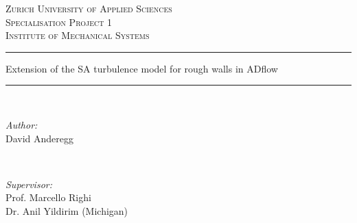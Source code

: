 \begin{titlepage}

\newcommand{\HRule}{\rule{\linewidth}{0.5mm}} %

\center %
 

\textsc{\LARGE Zurich University of Applied Sciences}\\[1.5cm] %
\textsc{\Large Specialisation Project 1}\\[0.5cm] %
\textsc{\large Institute of Mechanical Systems}\\[0.5cm] %


\HRule 
{ \huge \bfseries
  \begin{spacing}{1.2}
    Extension of the SA turbulence model for rough walls in ADflow
  \end{spacing}}
\HRule \\[0.5cm]
 

\begin{minipage}{0.4\textwidth}
\begin{flushleft} \large
\emph{Author:}\\
David Anderegg\\
\end{flushleft}
\end{minipage}
~
\begin{minipage}{0.4\textwidth}
\begin{flushright} \large
\emph{Supervisor:} \\
Prof. Marcello Righi \\
Dr. Anil Yildirim (Michigan)
\end{flushright}
\end{minipage}\\[1.5cm]


\end{titlepage}
